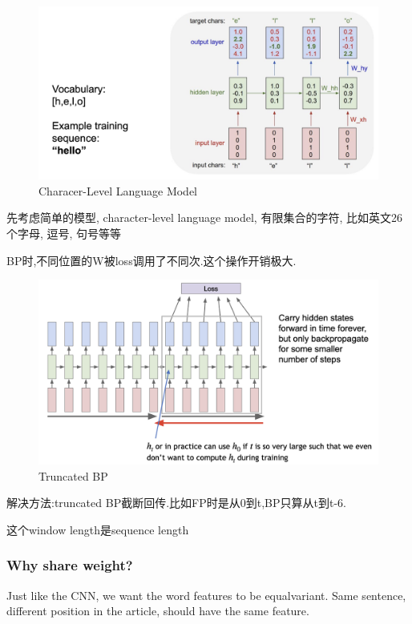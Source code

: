 	\begin{figure}[htbp]
		\centering
		\includegraphics[scale=0.3]{figures/word_model.png}
		\caption{Characer-Level Language Model}
	\end{figure}

	先考虑简单的模型, character-level language model, 有限集合的字符, 
	比如英文26个字母, 逗号, 句号等等

	BP时,不同位置的W被loss调用了不同次.这个操作开销极大.

	\begin{figure}[htbp]
		\centering
		\includegraphics[scale=0.3]{figures/truncate_bp.png}
		\caption{Truncated BP}
	\end{figure}
	
	解决方法:truncated BP截断回传.比如FP时是从0到t,BP只算从t到t-6.

	这个window length是sequence length

	\subsubsection{Why share weight?} 
	Just like the CNN, we want the word features to be equalvariant. 
	Same sentence, different position in the article, should have the same feature.

